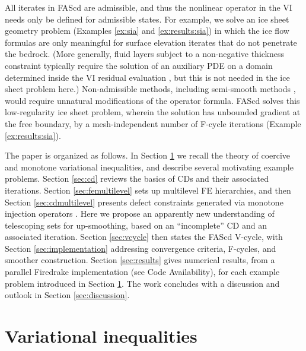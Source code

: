 \documentclass[letterpaper,final,12pt,reqno]{amsart}
\theoremstyle{cstyle}
\theoremstyle{cstyle*}
\theoremstyle{dstyle}
\numberwithin{equation}{section}
\numberwithin{figure}{section}
\numberwithin{table}{section}
\numberwithin{theorem}{section}
\begin{document}
All iterates in FAScd are admissible, and thus the nonlinear operator in the VI needs only be defined for admissible states.  For example, we solve an ice sheet geometry problem (Examples \ref{ex:sia} and \ref{ex:results:sia}) in which the ice flow formulas are only meaningful for surface elevation iterates that do not penetrate the bedrock.  (More generally, fluid layers subject to a non-negative thickness constraint typically require the solution of an auxiliary PDE on a domain determined inside the VI residual evaluation \cite{Bueler2021conservation}, but this is not needed in the ice sheet problem here.)  Non-admissible methods, including semi-smooth methods \cite{BensonMunson2006}, would require unnatural modifications of the operator formula.  FAScd solves this low-regularity ice sheet problem, wherein the solution has unbounded gradient at the free boundary, by a mesh-independent number of F-cycle iterations (Example \ref{ex:results:sia}).

The paper is organized as follows.  In Section \ref{sec:vi} we recall the theory of coercive and monotone variational inequalities, and describe several motivating example problems.  Section \ref{sec:cd} reviews the basics of CDs and their associated iterations.  Section \ref{sec:femultilevel} sets up multilevel FE hierarchies, and then Section \ref{sec:cdmultilevel} presents defect constraints generated via monotone injection operators \cite{GraeserKornhuber2009}.  Here we propose an apparently new understanding of telescoping sets for up-smoothing, based on an ``incomplete'' CD and an associated iteration.  Section \ref{sec:vcycle} then states the FAScd V-cycle, with Section \ref{sec:implementation} addressing convergence criteria, F-cycles, and smoother construction.  Section \ref{sec:results} gives numerical results, from a parallel Firedrake \cite{Rathgeberetal2016} implementation (see Code Availability), for each example problem introduced in Section \ref{sec:vi}.  The work concludes with a discussion and outlook in Section \ref{sec:discussion}.


\section{Variational inequalities} \label{sec:vi}
\end{document}
